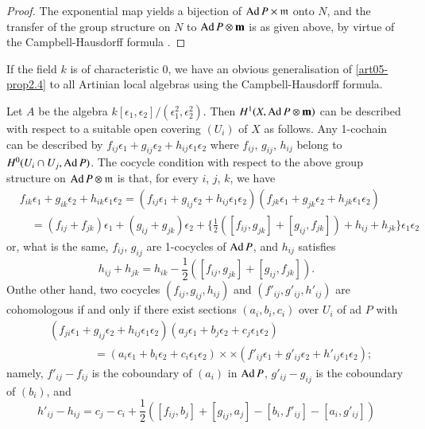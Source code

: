 \begin{proof}
The exponential map yields a bijection of $\operatorname{Ad} P\times \mathfrak{m}$ onto $N$,
and the transfer of the group structure on $N$ to $\operatorname{Ad} P\otimes \mathbf{m}$
is as given above, by virtue of the Campbell-Hausdorff
formula \cite[SGA 3, Expose VII, 3.1]{art05-key9}.
\end{proof}

\begin{subremark}\label{art05-rem2.5}
If the field $k$ is of characteristic 0, we have an obvious
generalisation of \ref{art05-prop2.4} to all Artinian local algebras using the
Campbell-Hausdorff formula.
\end{subremark}

\begin{example}\label{art05-exam2.6}
Let $A$ be the algebra
$k[\epsilon_{1},\epsilon_{2}]/(\epsilon^{2}_{1},\epsilon^{2}_{2})$. Then
$H^{1}(X,\operatorname{Ad} P\otimes \mathbf{m})$ can be described with respect to a
suitable open covering $(U_{i})$ of $X$ as follows. Any 1-cochain can
be described by
$f_{ij}\epsilon_{1}+g_{ij}\epsilon_{2}+h_{ij}\epsilon_{1}\epsilon_{2}$
where $f_{ij}$, $g_{ij}$, $h_{ij}$ belong to $H^{0}(U_{i}\cap
U_{j},\operatorname{Ad} P)$. The cocycle condition with respect to the above group
structure on $\operatorname{Ad} P\otimes \mathfrak{m}$ is that, for every $i$, $j$, $k$, we
have
{\fontsize{10pt}{11pt}\selectfont
\begin{align*}
&
f_{ik}\epsilon_{1}+g_{ik}\epsilon_{2}+h_{ik}\epsilon_{1}\epsilon_{2}=(f_{ij}\epsilon_{1}+g_{ij}\epsilon_{2}+h_{ij}\epsilon_{1}\epsilon_{2})(f_{jk}\epsilon_{1}+g_{jk}\epsilon_{2}+h_{jk}\epsilon_{1}\epsilon_{2})\\
&\quad
=(f_{ij}+f_{jk})\epsilon_{1}+(g_{ij}+g_{jk})\epsilon_{2}+\{\frac{1}{2}([f_{ij},g_{jk}]+[g_{ij},f_{jk}])+h_{ij}+h_{jk}\}\epsilon_{1}\epsilon_{2} 
\end{align*}}
or, what is the same, $f_{ij}$, $g_{ij}$ are 1-cocycles of $\operatorname{Ad} P$,
and $h_{ij}$ satisfies
\setcounter{equation}{6}
\begin{equation}
h_{ij}+h_{jk}=h_{ik}-\frac{1}{2}([f_{ij},g_{jk}]+[g_{ij},f_{jk}]).\label{art05-eq2.7} 
\end{equation}
On\pageoriginale the other hand, two cocycles $(f_{ij},g_{ij},h_{ij})$ and $(f'_{ij},g'_{ij},h'_{ij})$ are cohomologous if and only if there exist sections $(a_{i},b_{i},c_{i})$ over $U_{i}$ of ad $P$ with
\begin{align*}
& (f_{ji}\epsilon_{1}+g_{ij}\epsilon_{2}+h_{ij}\epsilon_{1}\epsilon_{2})(a_{j}\epsilon_{1}+b_{j}\epsilon_{2}+c_{j}\epsilon_{1}\epsilon_{2})\\
&\qquad\qquad = (a_{i}\epsilon_{1}+b_{i}\epsilon_{2}+c_{i}\epsilon_{1}\epsilon_{2})\times \times (f'_{ij}\epsilon_{1}+g'_{ij}\epsilon_{2}+h'_{ij}\epsilon_{1}\epsilon_{2}); 
\end{align*}
namely, $f'_{ij}-f_{ij}$ is the coboundary of $(a_{i})$ in $\operatorname{Ad} P$, $g'_{ij}-g_{ij}$ is the coboundary of $(b_{i})$, and 
\begin{equation}
h'_{ij}-h_{ij}=c_{j}-c_{i}+\frac{1}{2}([f_{ij},b_{j}]+[g_{ij},a_{j}]-[b_{i},f'_{ij}]-[a_{i},g'_{ij}])\label{art05-eq2.8}
\end{equation}
\end{example}


